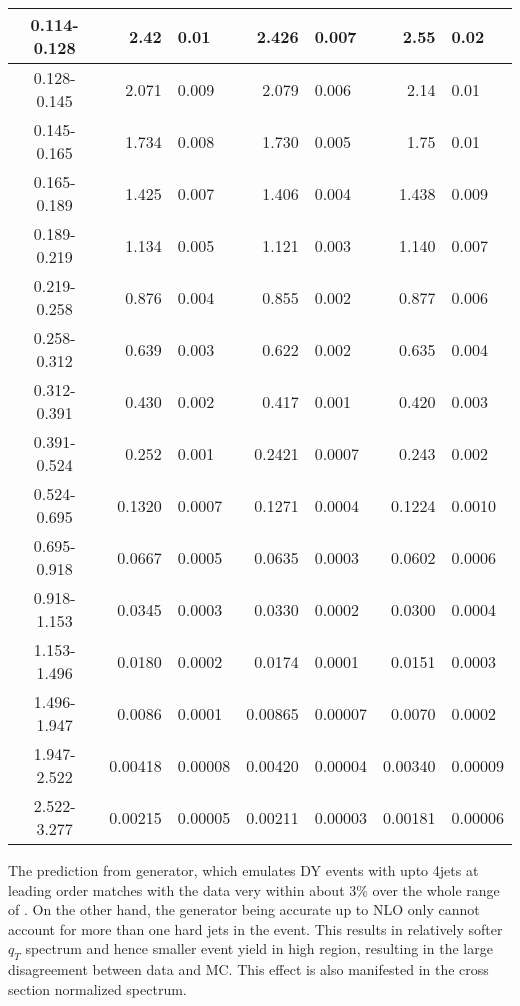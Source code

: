 \begin{table}
\begin{center}
\begin{tabular}{ | c | r@{$\pm$}l | r@{$\pm$}l | r@{$\pm$}l | }
0.114-0.128 & 2.42 & 0.01 & 2.426 & 0.007 & 2.55 & 0.02 \\ \hline
0.128-0.145 & 2.071 & 0.009 & 2.079 & 0.006 & 2.14 & 0.01 \\ \hline
0.145-0.165 & 1.734 & 0.008 & 1.730 & 0.005 & 1.75 & 0.01 \\ \hline
0.165-0.189 & 1.425 & 0.007 & 1.406 & 0.004 & 1.438 & 0.009 \\ \hline
0.189-0.219 & 1.134 & 0.005 & 1.121 & 0.003 & 1.140 & 0.007 \\ \hline
0.219-0.258 & 0.876 & 0.004 & 0.855 & 0.002 & 0.877 & 0.006 \\ \hline
0.258-0.312 & 0.639 & 0.003 & 0.622 & 0.002 & 0.635 & 0.004 \\ \hline
0.312-0.391 & 0.430 & 0.002 & 0.417 & 0.001 & 0.420 & 0.003 \\ \hline
0.391-0.524 & 0.252 & 0.001 & 0.2421 & 0.0007 & 0.243 & 0.002 \\ \hline
0.524-0.695 & 0.1320 & 0.0007 & 0.1271 & 0.0004 & 0.1224 & 0.0010 \\ \hline
0.695-0.918 & 0.0667 & 0.0005 & 0.0635 & 0.0003 & 0.0602 & 0.0006 \\ \hline
0.918-1.153 & 0.0345 & 0.0003 & 0.0330 & 0.0002 & 0.0300 & 0.0004 \\ \hline
1.153-1.496 & 0.0180 & 0.0002 & 0.0174 & 0.0001 & 0.0151 & 0.0003 \\ \hline
1.496-1.947 & 0.0086 & 0.0001 & 0.00865 & 0.00007 & 0.0070 & 0.0002 \\ \hline
1.947-2.522 & 0.00418 & 0.00008 & 0.00420 & 0.00004 & 0.00340 & 0.00009 \\ \hline
2.522-3.277 & 0.00215 & 0.00005 & 0.00211 & 0.00003 & 0.00181 & 0.00006 \\ \hline
\end{tabular}
\end{center}
\end{table}

The prediction from \MADGRAPH generator, which emulates DY events with upto 4jets at leading order matches with the data very within about 3\% over the whole range of \phistar. On the other
hand, the \POWHEG generator being accurate up to NLO only cannot account for  more than one hard jets in the event. This results in relatively softer $q_T$ spectrum and hence smaller event yield in high \phistar region, resulting in the large disagreement between data and MC. This effect is also manifested in the cross section normalized spectrum.





